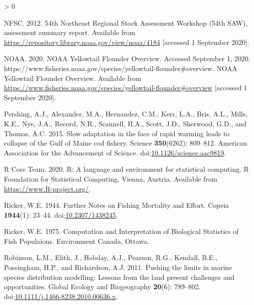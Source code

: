 \documentclass[
]{article}
\newlength{\cslhangindent}
\newenvironment{CSLReferences}[2] %
 {%
  \setlength{\parindent}{0pt}
  \ifodd #1 \everypar{\setlength{\hangindent}{\cslhangindent}}\ignorespaces\fi
  \ifnum #2 > 0
  \setlength{\parskip}{#2\baselineskip}
  \fi
 }%
 {}
\begin{document}
\begin{CSLReferences}{1}{0}
\leavevmode\hypertarget{ref-nfsc54thNortheastRegional2012}{}%
NFSC. 2012. 54th {Northeast Regional Stock Assessment Workshop} (54th {SAW}), assessment summary report. Available from \url{https://repository.library.noaa.gov/view/noaa/4184} {[}accessed 1 September 2020{]}.

\leavevmode\hypertarget{ref-NOAAYellowtailFlounder2020}{}%
NOAA. 2020. {NOAA Yellowtail Flounder Overview}. {Accessed September} 1, 2020. {https://www.fisheries.noaa.gov/species/yellowtail-flounder\#overview}. {NOAA Yellowtail Flounder Overview}. Available from \url{https://www.fisheries.noaa.gov/species/yellowtail-flounder\#overview} {[}accessed 1 September 2020{]}.

\leavevmode\hypertarget{ref-pershingSlowAdaptationFace2015}{}%
Pershing, A.J., Alexander, M.A., Hernandez, C.M., Kerr, L.A., Bris, A.L., Mills, K.E., Nye, J.A., Record, N.R., Scannell, H.A., Scott, J.D., Sherwood, G.D., and Thomas, A.C. 2015. Slow adaptation in the face of rapid warming leads to collapse of the {Gulf} of {Maine} cod fishery. Science \textbf{350}(6262): 809--812. {American Association for the Advancement of Science}. doi:\href{https://doi.org/10.1126/science.aac9819}{10.1126/science.aac9819}.

\leavevmode\hypertarget{ref-rcoreteamLanguageEnvironmentStatistical2020}{}%
R Core Team. 2020. R: {A} language and environment for statistical computing. {R Foundation for Statistical Computing}, {Vienna, Austria}. Available from \url{https://www.R-project.org/}.

\leavevmode\hypertarget{ref-rickerFurtherNotesFishing1944}{}%
Ricker, W.E. 1944. Further {Notes} on {Fishing Mortality} and {Effort}. Copeia \textbf{1944}(1): 23--44. doi:\href{https://doi.org/10.2307/1438245}{10.2307/1438245}.

\leavevmode\hypertarget{ref-rickerComputationInterpretationBiological1975}{}%
Ricker, W.E. 1975. Computation and {Interpretation} of {Biological Statistics} of {Fish Populaions}. {Environment Canada}, {Ottawa}.

\leavevmode\hypertarget{ref-robinsonPushingLimitsMarine2011}{}%
Robinson, L.M., Elith, J., Hobday, A.J., Pearson, R.G., Kendall, B.E., Possingham, H.P., and Richardson, A.J. 2011. Pushing the limits in marine species distribution modelling: Lessons from the land present challenges and opportunities. Global Ecology and Biogeography \textbf{20}(6): 789--802. doi:\href{https://doi.org/10.1111/j.1466-8238.2010.00636.x}{10.1111/j.1466-8238.2010.00636.x}.


\end{CSLReferences}
\end{document}
